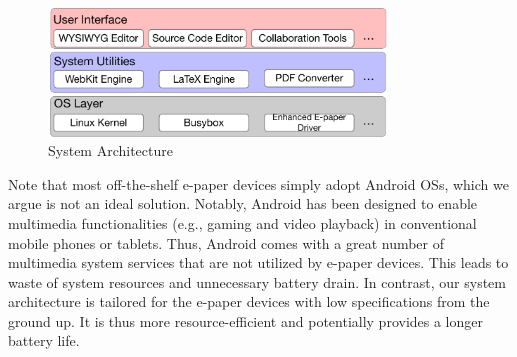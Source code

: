 \documentclass[]{sigchi}
\begin{document}

\begin{figure}[h]
\begin{center}
\includegraphics[width=0.8\textwidth]{figures/firefoxos}
\caption{System Architecture}
\label{fig:editingexample}
\end{center}
\end{figure}


Note that most off-the-shelf e-paper devices simply adopt Android OSs, which we argue is not an ideal solution.
Notably, Android has been designed to enable multimedia functionalities (e.g., gaming and video playback) in conventional mobile phones or tablets. Thus, Android comes with a great number of multimedia system services that are not utilized by e-paper devices. This leads to waste of system resources and unnecessary battery drain. In contrast, our system architecture is tailored for the e-paper devices with low specifications from the ground up. It is thus more resource-efficient and potentially provides a longer battery life.	


\end{document}
